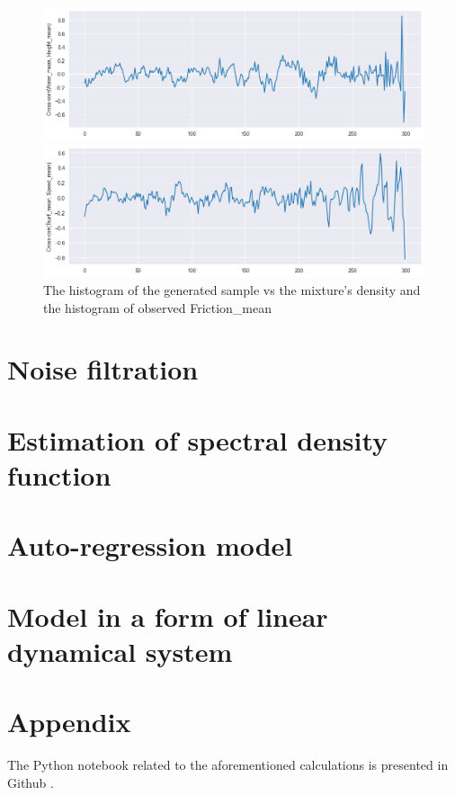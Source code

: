 \documentclass[12pt, bachelor, substylefile = algo_title.rtx]{disser}
\theoremstyle{definition}
\begin{document}
\begin{figure}[!h]
\begin{minipage}{.48\textwidth}
   \end{minipage}
   \begin{minipage}{.48\textwidth}
     \includegraphics[width=\linewidth]{ccf3}
   \end{minipage} \hfill
\begin{minipage}{.48\textwidth}
     \includegraphics[width=\linewidth]{ccf6}
   \end{minipage}
\caption{The histogram of the generated sample vs the mixture's density and the histogram of observed Friction\_mean}
\label{fig: 4}
\end{figure}


\section{Noise filtration}
\section{Estimation of spectral density function}
\section{Auto-regression model}
\section{Model in a form of linear dynamical system}



\section{Appendix}
The Python notebook related to the aforementioned calculations is presented in Github \cite{repogithub}.

{\small }

\end{document}
